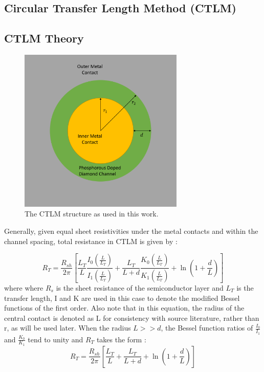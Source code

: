 \begin{refsection}
\section{Circular Transfer Length Method (CTLM)}
\subsection{CTLM Theory}
\label{subsec:ctlm_theory}
\begin{figure}[h]
    \centering
    \includegraphics[width=0.7\textwidth]{Chapter3/Figs/Raster/CTLM design.png}
    \caption{The CTLM structure as used in this work.}
    \label{fig:ctlm_structure}
\end{figure}
Generally, given equal sheet resistivities under the metal contacts and within the channel spacing, total resistance in CTLM is given by \cite{Amerasekera2002}:

\begin{equation}
    \label{eq:ctlm_very_general_schroder}
    R_{T} = \frac{R_{sh}}{2\pi} \left[
    \frac{L_{T}}{L} \frac{I_{0}\left(\frac{L}{L_{T}}\right)}{I_{1}\left(\frac{L}{L_{T}}\right)}      
    + \frac{L_{T}}{L + d} \frac{K_{0}\left(\frac{L}{L_{T}}\right)}{K_{1}\left(\frac{L}{L_{T}}\right)}  
    + \ln \left(1 + \frac{d}{L}\right) 
    \right]
\end{equation}
where where $R_{s}$ is the sheet resistance of the semiconductor layer and $L_{T}$ is the transfer length, I and K are used in this case to denote the modified Bessel functions of the first order. Also note that in this equation, the radius of the central contact is denoted as L for consistency with source literature, rather than r, as will be used later. When the radius $L>>d$, the Bessel function ratios of $\frac{I_{0}}{I_{1}}$ and $\frac{K_{0}}{K_{1}}$ tend to unity and $R_{T}$ takes the form \cite{Schroder2006-sx}:
\begin{equation}
    \label{eq:ctlm_schroder_general}
    R_{T} = \frac{R_{sh}}{2\pi} \left[ \frac{L_{T}}{L} + \frac{L_{T}}{L + d} + \ln \left(1 + \frac{d}{L}\right) \right]
\end{equation}


\end{refsection}

